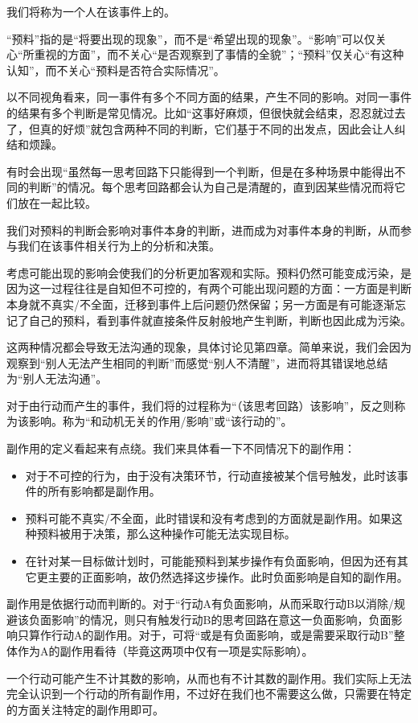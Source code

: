 我们将称为一个人在该事件上的。
\begin{explain}
“预料”指的是“将要出现的现象”，而不是“希望出现的现象”。“影响”可以仅关心“所重视的方面”，而不关心“是否观察到了事情的全貌”；“预料”仅关心“有这种认知”，而不关心“预料是否符合实际情况”。

以不同视角看来，同一事件有多个不同方面的结果，产生不同的影响。对同一事件的结果有多个判断是常见情况。比如“这事好麻烦，但很快就会结束，忍忍就过去了，但真的好烦”就包含两种不同的判断，它们基于不同的出发点，因此会让人纠结和烦躁。

有时会出现“虽然每一思考回路下只能得到一个判断，但是在多种场景中能得出不同的判断”的情况。每个思考回路都会认为自己是清醒的，直到因某些情况而将它们放在一起比较。
\end{explain}
我们对预料的判断会影响对事件本身的判断，进而成为对事件本身的判断，从而参与我们在该事件相关行为上的分析和决策。
\begin{explain}
考虑可能出现的影响会使我们的分析更加客观和实际。预料仍然可能变成污染，是因为这一过程往往是自知但不可控的，有两个可能出现问题的方面：一方面是判断本身就不真实/不全面，迁移到事件上后问题仍然保留；另一方面是有可能逐渐忘记了自己的预料，看到事件就直接条件反射般地产生判断，判断也因此成为污染。

这两种情况都会导致无法沟通的现象，具体讨论见第四章。简单来说，我们会因为观察到“别人无法产生相同的判断”而感觉“别人不清醒”，进而将其错误地总结为“别人无法沟通”。
\end{explain}
对于由行动而产生的事件，我们将的过程称为“（该思考回路）该影响”，反之则称为该影响。称为“和动机无关的作用/影响”或“该行动的”。
\begin{explain}
副作用的定义看起来有点绕。我们来具体看一下不同情况下的副作用：
\begin{itemize}
\item 对于不可控的行为，由于没有决策环节，行动直接被某个信号触发，此时该事件的所有影响都是副作用。
\item 预料可能不真实/不全面，此时错误和没有考虑到的方面就是副作用。如果这种预料被用于决策，那么这种操作可能无法实现目标。
\item 在针对某一目标做计划时，可能能预料到某步操作有负面影响，但因为还有其它更主要的正面影响，故仍然选择这步操作。此时负面影响是自知的副作用。
\end{itemize}
副作用是依据行动而判断的。对于“行动A有负面影响，从而采取行动B以消除/规避该负面影响”的情况，则只有触发行动B的思考回路在意这一负面影响，负面影响只算作行动A的副作用。对于\rigorous，可将“或是有负面影响，或是需要采取行动B”整体作为A的副作用看待（毕竟这两项中仅有一项是实际影响）。

一个行动可能产生不计其数的影响，从而也有不计其数的副作用。我们实际上无法完全认识到一个行动的所有副作用，不过好在我们也不需要这么做，只需要在特定的方面关注特定的副作用即可。
\end{explain}

